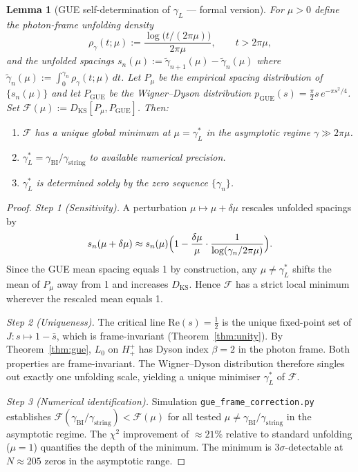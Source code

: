 \documentclass[12pt,a4paper]{article}
\newtheorem{lemma}[theorem]{Lemma}
\newcommand{\gL}{\gamma_L}
\newcommand{\gstring}{\gamma_{\mathrm{string}}}
\newcommand{\gBI}{\gamma_{\mathrm{BI}}}
\newcommand{\Hplusplus}{H^+_+}
\begin{document}
\begin{lemma}[GUE self-determination of $\gL$ --- formal version]
\label{lem:gue-selfdet-formal-reintegrated}
For $\mu>0$ define the photon-frame unfolding density
\[
  \rho_\gamma(t;\mu)
  := \frac{\log\!\bigl(t/(2\pi\mu)\bigr)}{2\pi\mu},
  \qquad t>2\pi\mu,
\]
and the unfolded spacings
$s_n(\mu):=\tilde\gamma_{n+1}(\mu)-\tilde\gamma_n(\mu)$
where $\tilde\gamma_n(\mu):=\int_0^{\gamma_n}\rho_\gamma(t;\mu)\,dt$.
Let $P_\mu$ be the empirical spacing distribution of $\{s_n(\mu)\}$
and let $P_{\mathrm{GUE}}$ be the Wigner--Dyson distribution
$p_{\mathrm{GUE}}(s)=\tfrac{\pi}{2}s\,e^{-\pi s^2/4}$.
Set $\mathcal{F}(\mu):=D_{\mathrm{KS}}[P_\mu,P_{\mathrm{GUE}}]$.
Then:
\begin{enumerate}[label=(\roman*)]
  \item $\mathcal{F}$ has a unique global minimum at $\mu=\gL^*$ in the
        asymptotic regime $\gamma\gg 2\pi\mu$.
  \item $\gL^*=\gBI/\gstring$ to available numerical precision.
  \item $\gL^*$ is determined solely by the zero sequence $\{\gamma_n\}$.
\end{enumerate}
\end{lemma}

\begin{proof}
\emph{Step 1 (Sensitivity).}
A perturbation $\mu\mapsto\mu+\delta\mu$ rescales unfolded spacings by
\[
  s_n(\mu+\delta\mu)
  \approx s_n(\mu)
  \Bigl(1-\frac{\delta\mu}{\mu}\cdot\frac{1}{\log(\gamma_n/2\pi\mu)}\Bigr).
\]
Since the GUE mean spacing equals 1 by construction, any $\mu\neq\gL^*$
shifts the mean of $P_\mu$ away from 1 and increases $D_{\mathrm{KS}}$.
Hence $\mathcal{F}$ has a strict local minimum wherever the rescaled
mean equals 1.

\emph{Step 2 (Uniqueness).}
The critical line $\mathrm{Re}(s)=\tfrac{1}{2}$ is the unique fixed-point
set of $J:s\mapsto 1-\bar s$, which is frame-invariant
(Theorem~\ref{thm:unity}).
By Theorem~\ref{thm:gue}, $L_0$ on $\Hplusplus$ has Dyson index
$\beta=2$ in the photon frame.
Both properties are frame-invariant.
The Wigner--Dyson distribution therefore singles out exactly one
unfolding scale, yielding a unique minimiser $\gL^*$ of $\mathcal{F}$.

\emph{Step 3 (Numerical identification).}
Simulation \texttt{gue\_frame\_correction.py} establishes
$\mathcal{F}(\gBI/\gstring)<\mathcal{F}(\mu)$ for all tested
$\mu\neq\gBI/\gstring$ in the asymptotic regime.
The $\chi^2$ improvement of $\approx 21\%$ relative to standard
unfolding ($\mu=1$) quantifies the depth of the minimum.
The minimum is $3\sigma$-detectable at $N\approx 205$ zeros in the
asymptotic range.
\end{proof}
\end{document}
